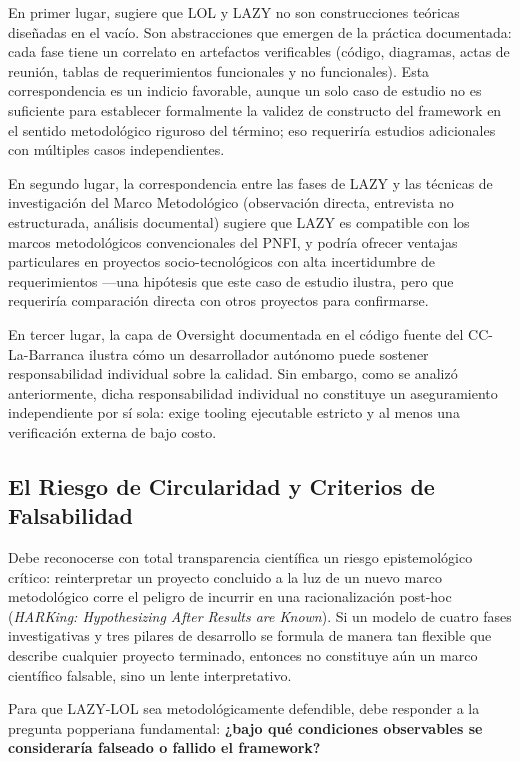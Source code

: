 \documentclass[14pt,a4paper,oneside]{extbook}
\begin{document}
En primer lugar, sugiere que LOL y LAZY no son construcciones teóricas diseñadas en el vacío. Son abstracciones que emergen de la práctica documentada: cada fase tiene un correlato en artefactos verificables (código, diagramas, actas de reunión, tablas de requerimientos funcionales y no funcionales). Esta correspondencia es un indicio favorable, aunque un solo caso de estudio no es suficiente para establecer formalmente la validez de constructo del framework en el sentido metodológico riguroso del término; eso requeriría estudios adicionales con múltiples casos independientes.

En segundo lugar, la correspondencia entre las fases de LAZY y las técnicas de investigación del Marco Metodológico (observación directa, entrevista no estructurada, análisis documental) sugiere que LAZY es compatible con los marcos metodológicos convencionales del PNFI, y podría ofrecer ventajas particulares en proyectos socio-tecnológicos con alta incertidumbre de requerimientos ---una hipótesis que este caso de estudio ilustra, pero que requeriría comparación directa con otros proyectos para confirmarse.

En tercer lugar, la capa de Oversight documentada en el código fuente del CC-La-Barranca ilustra cómo un desarrollador autónomo puede sostener responsabilidad individual sobre la calidad. Sin embargo, como se analizó anteriormente, dicha responsabilidad individual no constituye un aseguramiento independiente por sí sola: exige tooling ejecutable estricto y al menos una verificación externa de bajo costo.

\subsection{El Riesgo de Circularidad y Criterios de Falsabilidad}

Debe reconocerse con total transparencia científica un riesgo epistemológico crítico: reinterpretar un proyecto concluido a la luz de un nuevo marco metodológico corre el peligro de incurrir en una racionalización post-hoc (\textit{HARKing: Hypothesizing After Results are Known}). Si un modelo de cuatro fases investigativas y tres pilares de desarrollo se formula de manera tan flexible que describe cualquier proyecto terminado, entonces no constituye aún un marco científico falsable, sino un lente interpretativo.

Para que LAZY-LOL sea metodológicamente defendible, debe responder a la pregunta popperiana fundamental: \textbf{¿bajo qué condiciones observables se consideraría falseado o fallido el framework?}
\end{document}
